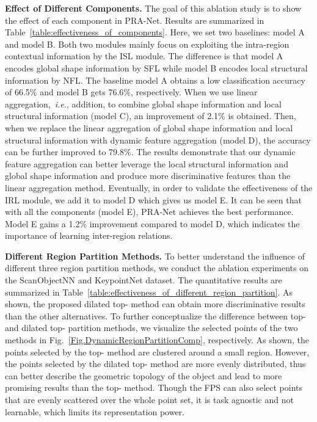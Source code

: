 \documentclass[journal]{IEEEtran}
\def\ie{\emph{i.e.}}
\begin{document}
\noindent\textbf{Effect of Different Components.} The goal of this ablation study is to show the effect of each component in PRA-Net. Results are summarized in Table~\ref{table:effectiveness_of_components}. Here, we set two baselines: model A and model B. Both two modules mainly focus on exploiting the intra-region contextual information by the ISL module. The difference is that model A encodes global shape information by SFL while model B encodes local structural information by NFL. The baseline model A obtains a low classification accuracy of 66.5\% and model B gets 76.6\%, respectively. When we use linear aggregation,~\ie, addition, to combine global shape information and local structural information (model C), an improvement of 2.1\% is obtained. Then, when we replace the linear aggregation of global shape information and local structural information with dynamic feature aggregation (model D), the accuracy can be further improved to 79.8\%. The results demonstrate that our dynamic feature aggregation can better leverage the local structural information and global shape information and produce more discriminative features than the linear aggregation method. Eventually, in order to validate the effectiveness of the IRL module, we add it to model D which gives us model E. It can be seen that with all the components (model E), PRA-Net achieves the best performance. Model E gains a 1.2\% improvement compared to model D, which indicates the importance of learning inter-region relations.



\noindent\textbf{Different Region Partition Methods.} To better understand the influence of different three region partition methods, we conduct the ablation experiments on the ScanObjectNN and KeypointNet dataset. The quantitative results are summarized in Table~\ref{table:effectiveness_of_different_region_partition}. As shown, the proposed dilated top- method can obtain more discriminative results than the other alternatives. To further conceptualize the difference between top- and dilated top- partition methods, we visualize the selected points of the two methods in Fig.~\ref{Fig.DynamicRegionPartitionComp}, respectively. As shown, the points selected by the top- method are clustered around a small region. However, the points selected by the dilated top- method are more evenly distributed, thus can better describe the geometric topology of the object and lead to more promising results than the top- method. Though the FPS can also select points that are evenly scattered over the whole point set, it is task agnostic and not learnable, which limits its representation power.
\end{document}
